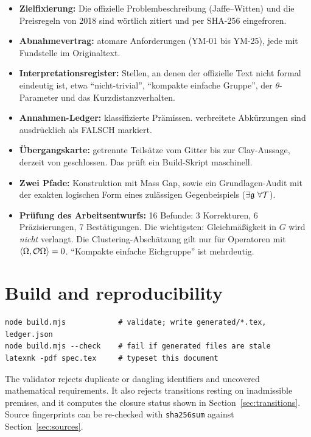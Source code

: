 \documentclass[11pt,a4paper]{article}
\begin{document}
\begin{itemize}
\item \textbf{Zielfixierung:} Die offizielle Problembeschreibung (Jaffe--Witten) und die Preisregeln von 2018 sind wörtlich zitiert und per SHA-256 eingefroren.
\item \textbf{Abnahmevertrag:} \NumRequirements{} atomare Anforderungen (YM-01 bis YM-25), jede mit Fundstelle im Originaltext.
\item \textbf{Interpretationsregister:} \NumInterpretations{} Stellen, an denen der offizielle Text nicht formal eindeutig ist, etwa \enquote{nicht-trivial}, \enquote{kompakte einfache Gruppe}, der $\theta$-Parameter und das Kurzdistanzverhalten.
\item \textbf{Annahmen-Ledger:} \NumAssumptions{} klassifizierte Prämissen. \NumFalseAssumptions{} verbreitete Abkürzungen sind ausdrücklich als FALSCH markiert.
\item \textbf{Übergangskarte:} \NumTransitions{} getrennte Teilsätze vom Gitter bis zur Clay-Aussage, derzeit \NumClosedTransitions{} von \NumTransitions{} geschlossen. Das prüft ein Build-Skript maschinell.
\item \textbf{Zwei Pfade:} Konstruktion mit Mass Gap, sowie ein Grundlagen-Audit mit der exakten logischen Form eines zulässigen Gegenbeispiels ($\exists\g\ \forall\cT$).
\item \textbf{Prüfung des Arbeitsentwurfs:} 16 Befunde: 3 Korrekturen, 6 Präzisierungen, 7 Bestätigungen. Die wichtigsten: Gleichmäßigkeit in $G$ wird \emph{nicht} verlangt. Die Clustering-Abschätzung gilt nur für Operatoren mit $\langle\Omega,\mathcal O\Omega\rangle=0$. \enquote{Kompakte einfache Eichgruppe} ist mehrdeutig.
\end{itemize}

\section{Build and reproducibility}\label{app:build}
\begin{verbatim}
node build.mjs            # validate; write generated/*.tex, ledger.json
node build.mjs --check    # fail if generated files are stale
latexmk -pdf spec.tex     # typeset this document
\end{verbatim}
The validator rejects duplicate or dangling identifiers and uncovered mathematical requirements. It also rejects transitions resting on inadmissible premises, and it computes the closure status shown in Section~\ref{sec:transitions}. Source fingerprints can be re-checked with \texttt{sha256sum} against Section~\ref{sec:sources}.
\end{document}
